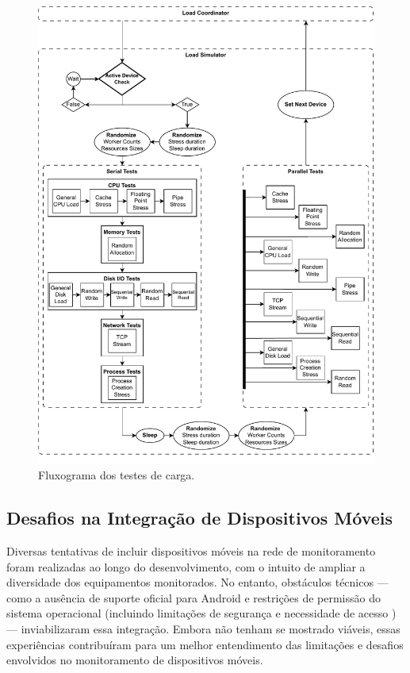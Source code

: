 \begin{figure}[H]
\centering
\includegraphics[width=\textwidth]{Imagens/chap03/load_flowchart.pdf}
\caption{Fluxograma dos testes de carga.}
\label{fig:FluxogramaCarga}
\end{figure}

\newpage

\subsection{Desafios na Integração de Dispositivos Móveis}
\label{subsection:DesafiosDispositivosMoveis}

Diversas tentativas de incluir dispositivos móveis na rede de monitoramento foram realizadas ao longo do desenvolvimento, com o intuito de ampliar a diversidade dos equipamentos monitorados. No entanto, obstáculos técnicos --- como a ausência de suporte oficial para Android e restrições de permissão do sistema operacional (incluindo limitações de segurança e necessidade de acesso ) --- inviabilizaram essa integração. Embora não tenham se mostrado viáveis, essas experiências contribuíram para um melhor entendimento das limitações e desafios envolvidos no monitoramento de dispositivos móveis.

